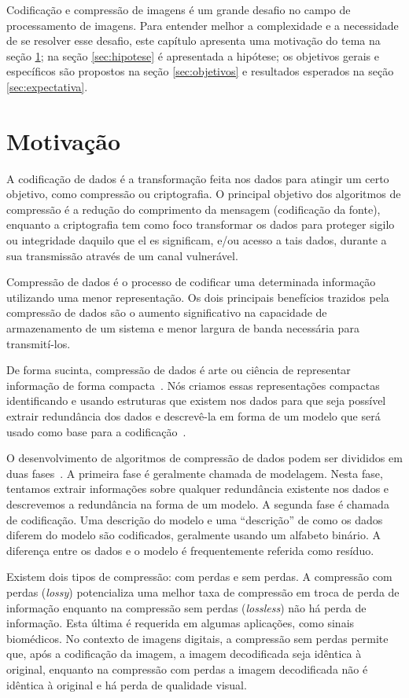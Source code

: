Codificação e compressão de imagens é um grande desafio no campo de processamento de imagens. Para entender melhor a complexidade e a necessidade de se resolver esse desafio, este capítulo apresenta uma motivação do tema na seção \ref{sec:motivacao}; na seção \ref{sec:hipotese} é apresentada a hipótese; os objetivos gerais e específicos são propostos na seção \ref{sec:objetivos} e  resultados esperados na seção \ref{sec:expectativa}.

\section{Motivação}
\label{sec:motivacao}
A codificação de dados é a transformação feita nos dados para atingir um certo objetivo, como compressão ou criptografia. O principal objetivo dos algoritmos de compressão é a redução do comprimento da mensagem (codificação da fonte), enquanto a criptografia tem como foco transformar os dados para proteger sigilo ou integridade daquilo que el es significam, e/ou acesso a tais dados, durante a sua transmissão através de um canal vulnerável.

Compressão de dados é o processo de codificar uma determinada informação utilizando uma menor representação. Os dois principais benefícios trazidos pela compressão de dados são o aumento significativo na capacidade de armazenamento de um sistema e menor largura de banda necessária para transmití-los.  

De forma sucinta, compressão de dados é arte ou ciência de representar informação de forma compacta~\cite{sayood2017introduction}. Nós criamos essas representações compactas identificando e usando estruturas que existem nos dados para que seja possível extrair redundância dos dados e descrevê-la em forma de um modelo que será usado como base para a codificação~\cite{sayood2017introduction}. 

O desenvolvimento de algoritmos de compressão de dados podem ser divididos em duas fases~\cite{sayood2017introduction}. A primeira fase é geralmente chamada de modelagem. Nesta fase, tentamos extrair informações sobre qualquer redundância existente nos dados e descrevemos a redundância na forma de um modelo. A segunda fase é chamada de codificação. Uma descrição do modelo e uma ``descrição'' de como os dados diferem do modelo são codificados, geralmente usando um alfabeto binário. A diferença entre os dados e o modelo é frequentemente referida como resíduo.

Existem dois tipos de compressão: com perdas e sem perdas. A compressão com perdas (\textit{lossy}) potencializa uma melhor taxa de compressão em troca de perda de informação enquanto na compressão sem perdas (\textit{lossless}) não há perda de informação. Esta última é requerida em algumas aplicações, como sinais biomédicos. No contexto de imagens digitais, a compressão sem perdas permite que, após a codificação da imagem, a imagem decodificada seja idêntica à original, enquanto na compressão com perdas a imagem decodificada não é idêntica à original e há perda de qualidade visual.

